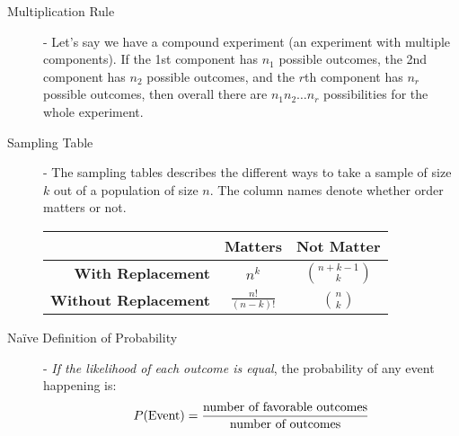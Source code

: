 \documentclass[10pt,landscape]{article}
\begin{document}
\begin{multicols}{3}
\begin{description}
    \item[Multiplication Rule] - Let's say we have a compound experiment (an experiment with multiple components). If the 1st component has $n_1$ possible outcomes, the 2nd component has $n_2$ possible outcomes, and the $r$th component has $n_r$ possible outcomes, then overall there are $n_1n_2 \dots n_r$ possibilities for the whole experiment.
    \item[Sampling Table] - The sampling tables describes the different ways to take a sample of size $k$ out of a population of size $n$. The column names denote whether order matters or not.\\
        \begin{center}
            \begin{tabular}{r|cc}
                 & \textbf{Matters} & \textbf{Not Matter} \\ \hline
                \textbf{With Replacement} & $\displaystyle n^k$ & $\displaystyle{n+k-1 \choose k}$ \\
                \textbf{Without Replacement} & $\displaystyle\frac{n!}{(n - k)!}$ & $\displaystyle{n \choose k}$
            \end{tabular}
        \end{center}
    \item[Na\"{i}ve Definition of Probability] - \emph{If the likelihood of each outcome is equal}, the probability of any event happening is:
        \[P(\textnormal{Event}) = \frac{\textnormal{number of favorable outcomes}}{\textnormal{number of outcomes}}\]
\end{description}


\end{multicols}
\end{document}
